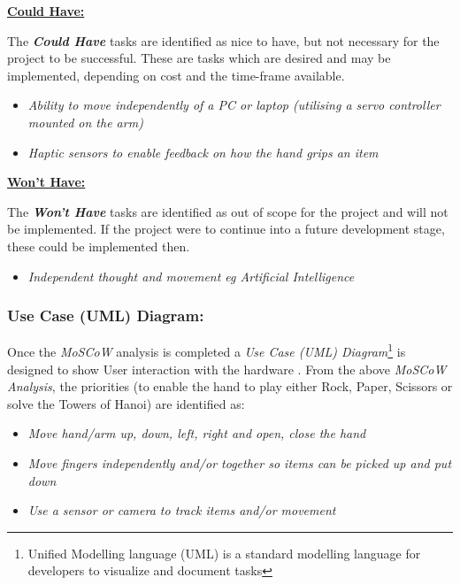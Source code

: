 \documentclass[progress]{cmpreport}
\begin{document}
\textbf{\underline{Could Have:}}
 
The \textbf{\textit{Could Have}} tasks are identified as nice to have, but not necessary for the project to be successful. These are tasks which are desired and may be implemented, depending on cost and the time-frame available. 
\begin{itemize}	
	\item \textit{Ability to move independently of a PC or laptop (utilising a servo controller mounted on the arm)}
	\item \textit{Haptic sensors to enable feedback on how the hand grips an item} \newline
\end{itemize}

\textbf{\underline{Won't Have:}} 

The \textbf{\textit{Won't Have}} tasks are identified as out of scope for the project and will not be implemented. If the project were to continue into a future development stage, these could be implemented then.  

\begin{itemize}		
	\item \textit{Independent thought and movement eg Artificial Intelligence } 
\end{itemize}

\subsubsection{Use Case (UML) Diagram:}

Once the \textit{MoSCoW} analysis is completed a \textit{Use Case (UML) Diagram}\footnote{Unified Modelling language (UML) is a standard modelling language for developers to visualize and document tasks} is designed to show User interaction with the hardware \citep{AljamaanLBGF14}. From the above \textit{MoSCoW Analysis}, the priorities (to enable the hand to play either Rock, Paper, Scissors or solve the Towers of Hanoi) are identified as:

\begin{itemize}		
	\item \textit{Move hand/arm up, down, left, right and open, close the hand}
	\item \textit{Move fingers independently and/or together so items can be picked up and put down}
	\item \textit{Use a sensor or camera to track items and/or movement}
\end{itemize}
\end{document}

